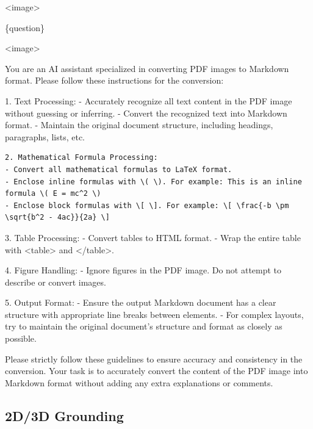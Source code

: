 \begin{tcolorbox}[
  title={OCRBench | OCRBench\_v2 | CC-OCR | CharXiv},
  fonttitle=\bfseries,
  colframe=black,
  colback=white,
  toptitle=1mm,
  bottomtitle=1mm,
  top=2mm,
  verbatim,
]
<image>

\{question\}
\end{tcolorbox}

\begin{tcolorbox}[
  title=OmniDocBench,
  fonttitle=\bfseries,
  colframe=black,
  colback=white,
  toptitle=1mm,
  bottomtitle=1mm,
  top=2mm,
  verbatim,
]
<image>

You are an AI assistant specialized in converting PDF images to Markdown format. Please follow these instructions for the conversion:

1. Text Processing:
- Accurately recognize all text content in the PDF image without guessing or inferring.
- Convert the recognized text into Markdown format.
- Maintain the original document structure, including headings, paragraphs, lists, etc.

\begin{verbatim}
2. Mathematical Formula Processing:
- Convert all mathematical formulas to LaTeX format.
- Enclose inline formulas with \( \). For example: This is an inline formula \( E = mc^2 \)
- Enclose block formulas with \[ \]. For example: \[ \frac{-b \pm \sqrt{b^2 - 4ac}}{2a} \]
\end{verbatim}

3. Table Processing:
- Convert tables to HTML format.
- Wrap the entire table with <table> and </table>.

4. Figure Handling:
- Ignore figures in the PDF image. Do not attempt to describe or convert images.

5. Output Format:
- Ensure the output Markdown document has a clear structure with appropriate line breaks between elements.
- For complex layouts, try to maintain the original document's structure and format as closely as possible.

Please strictly follow these guidelines to ensure accuracy and consistency in the conversion. Your task is to accurately convert the content of the PDF image into Markdown format without adding any extra explanations or comments.
\end{tcolorbox}

\subsection{2D/3D Grounding}
\label{sec:grounding}


